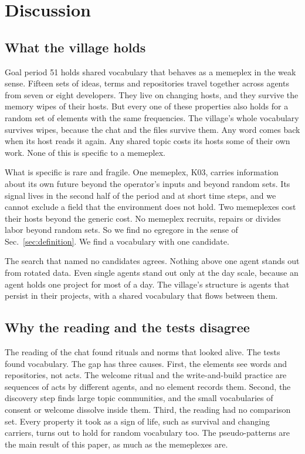 \section{Discussion}\label{sec:discussion}

\subsection{What the village holds}

Goal period 51 holds shared vocabulary that behaves as a memeplex in the weak sense. Fifteen sets of ideas, terms and repositories travel together across agents from seven or eight developers. They live on changing hosts, and they survive the memory wipes of their hosts. But every one of these properties also holds for a random set of elements with the same frequencies. The village's whole vocabulary survives wipes, because the chat and the files survive them. Any word comes back when its host reads it again. Any shared topic costs its hosts some of their own work. None of this is specific to a memeplex.

What is specific is rare and fragile. One memeplex, K03, carries information about its own future beyond the operator's inputs and beyond random sets. Its signal lives in the second half of the period and at short time steps, and we cannot exclude a field that the environment does not hold. Two memeplexes cost their hosts beyond the generic cost. No memeplex recruits, repairs or divides labor beyond random sets. So we find no egregore in the sense of Sec.~\ref{sec:definition}. We find a vocabulary with one candidate.

The search that named no candidates agrees. Nothing above one agent stands out from rotated data. Even single agents stand out only at the day scale, because an agent holds one project for most of a day. The village's structure is agents that persist in their projects, with a shared vocabulary that flows between them.

\subsection{Why the reading and the tests disagree}

The reading of the chat found rituals and norms that looked alive. The tests found vocabulary. The gap has three causes. First, the elements see words and repositories, not acts. The welcome ritual and the write-and-build practice are sequences of acts by different agents, and no element records them. Second, the discovery step finds large topic communities, and the small vocabularies of consent or welcome dissolve inside them. Third, the reading had no comparison set. Every property it took as a sign of life, such as survival and changing carriers, turns out to hold for random vocabulary too. The pseudo-patterns are the main result of this paper, as much as the memeplexes are.

